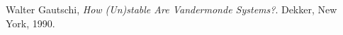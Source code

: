 \begin{thebibliography}{9}
    Walter Gautschi,
    \emph{How (Un)stable Are Vandermonde Systems?}.
    Dekker, New York,
    1990.
\end{thebibliography}
